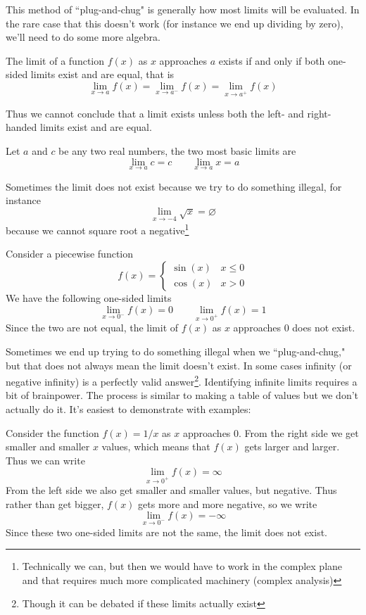 This method of ``plug-and-chug" is generally how most limits will be evaluated. In the rare case that this doesn't work (for instance we end up dividing by zero), we'll need to do some more algebra.

\begin{theorem}
The limit of a function $f(x)$ as $x$ approaches $a$ exists if and only if both one-sided limits exist and are equal, that is
\[ \lim_{x \to a} f(x) = \lim_{x \to a^-} f(x) = \lim_{x \to a^+} f(x) \]
\end{theorem}

Thus we cannot conclude that a limit exists unless both the left- and right-handed limits exist and are equal. 

\begin{example}
	Let $a$ and $c$ be any two real numbers, the two most basic limits are
	\[ \lim_{x \to a} c = c \qquad \lim_{x \to a} x = a \]
\end{example}


\begin{example}
	Sometimes the limit does not exist because we try to do something illegal, for instance
	\[ \lim_{x \to -4} \sqrt{x} = \varnothing \]
	because we cannot square root a negative\footnote{Technically we can, but then we would have to work in the complex plane and that requires much more complicated machinery (complex analysis)}
\end{example}

\begin{example}
	Consider a piecewise function
	\[ f(x) = \begin{cases} 
	\sin(x) & x \leq 0 \\ 
	\cos(x) & x > 0 
	\end{cases} \]
	We have the following one-sided limits
	\[ \lim_{x \to 0^-} f(x) = 0 \qquad \lim_{x \to 0^+} f(x)= 1 \]
	Since the two are not equal, the limit of $f(x)$ as $x$ approaches $0$ does not exist.
\end{example}

Sometimes we end up trying to do something illegal when we ``plug-and-chug," but that does not always mean the limit doesn't exist. In some cases infinity (or negative infinity) is a perfectly valid answer\footnote{Though it can be debated if these limits actually exist}. Identifying infinite limits requires a bit of brainpower. The process is similar to making a table of values but we don't actually do it. It's easiest to demonstrate with examples:

\begin{example}
	Consider the function $f(x) = 1/x$ as $x$ approaches 0. From the right side we get smaller and smaller $x$ values, which means that $f(x)$ gets larger and larger. Thus we can write
	\[ \lim_{x \to 0^+} f(x) = \infty \]
	From the left side we also get smaller and smaller values, but negative. Thus rather than get bigger, $f(x)$ gets more and more negative, so we write
	\[ \lim_{x \to 0^-} f(x) = -\infty \]
	Since these two one-sided limits are not the same, the limit does not exist.
\end{example}


